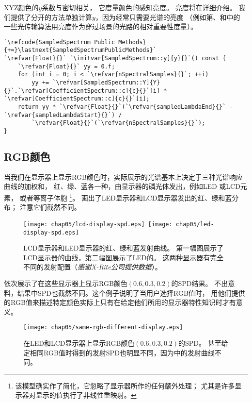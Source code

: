 XYZ颜色的$y$系数与密切相关，
它度量颜色的感知亮度。
亮度将在详细介绍。
我们提供了分开的方法单独计算$y$，因为经常只需要光谱的亮度
（例如第、和中的
一些光传输算法用亮度作为穿过场景的光路的相对重要性度量）。
\begin{lstlisting}
`\refcode{SampledSpectrum Public Methods}{+=}\lastnext{SampledSpectrumPublicMethods}`
`\refvar{Float}{}` `\initvar[SampledSpectrum::y]{y}{}`() const { 
    `\refvar{Float}{}` yy = 0.f;
    for (int i = 0; i < `\refvar{nSpectralSamples}{}`; ++i)
        yy += `\refvar[SampledSpectrum::Y]{Y}{}`.`\refvar[CoefficientSpectrum::c]{c}{}`[i] * `\refvar[CoefficientSpectrum::c]{c}{}`[i];
    return yy * `\refvar{Float}{}`(`\refvar{sampledLambdaEnd}{}` - `\refvar{sampledLambdaStart}{}`) /
        `\refvar{Float}{}`(`\refvar{nSpectralSamples}{}`);
}
\end{lstlisting}

\subsection{RGB颜色}\label{sub:RGB颜色}

当我们在显示器上显示RGB颜色时，实际展示的光谱基本上决定于三种光谱响应曲线的加权和，
红、绿、蓝各一种，由显示器的磷光体发出，例如LED
或LCD元素，
或者等离子体胞
\footnote{该模型确实作了简化，它忽略了显示器所作的任何额外处理；
    尤其是许多显示器对显示的值执行了非线性重映射。}。
画出了LED显示器和LCD显示器发出的红、绿和蓝分布；
注意它们截然不同。
\begin{figure}[htbp]
    \centering\texttt{[image: chap05/lcd-display-spd.eps]}\,
    \texttt{[image: chap05/led-display-spd.eps]}
    \caption{LCD显示器和LED显示器的红、绿和蓝发射曲线。
    第一幅图展示了LCD显示器的曲线，第二幅图展示了LED的。
    这两种显示器有完全不同的发射配置（{\itshape 感谢X-Rite公司提供数据}）。}
    \label{fig:5.4}
\end{figure}

依次展示了在这些显示器上显示RGB颜色$(0.6,0.3,0.2)$的SPD结果。
不出意料，结果中SPD也截然不同。这个例子说明了当用户选择RGB值时，
用他们提供的RGB值来描述特定颜色实际上只有在给定他们所用的显示器特性知识时才有意义。
\begin{figure}[htbp]
    \centering\texttt{[image: chap05/same-rgb-different-display.eps]}
    \caption{在LED和LCD显示器上显示RGB颜色$(0.6,0.3,0.2)$的SPD。
        甚至给定相同RGB值时得到的发射SPD也明显不同，因为中的发射曲线不同。}
    \label{fig:5.5}
\end{figure}

